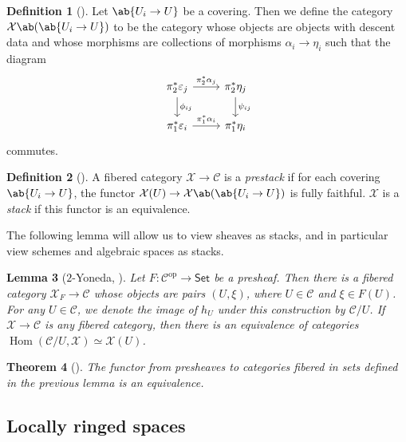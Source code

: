 \documentclass{amsart}
\newtheorem{thm}{Theorem}[section]
\newtheorem{lem}[thm]{Lemma}
\theoremstyle{definition}
\newtheorem{defn}[thm]{Definition}
\theoremstyle{remark}
\theoremstyle{plain}
\theoremstyle{definition}
\theoremstyle{remark}
\newcommand{\ep}{\varepsilon}
\newcommand{\mc}[1]{\mathcal{#1}}
\newcommand{\mr}[1]{\mathrm{#1}}
\newcommand{\ms}[1]{\mathsf{#1}}
\newcommand{\1}{\mathbf{1}}
\newcommand{\2}{\mathbf{2}}
\newcommand{\3}{\mathbf{3}}
\newcommand{\opp}{\mr{op}}
\DeclareMathOperator{\Hom}{Hom}
\begin{document}
\begin{defn}[{\cite[Section 6.1]{fganotes}}]
    Let $\ab\{U_i \to U\}$ be a covering. Then we define the category $\mc{X}\ab(\ab\{U_i \to U\})$ to be the category whose objects are objects with descent data and whose morphisms are collections of morphisms $\alpha_i \to \eta_i$ such that the diagram
    \begin{equation*}
    \begin{tikzcd}
        \pi_2^* \ep_j \ar{d}{\phi_{ij}} \ar{r}{\pi_2^* \alpha_j} & \pi_2^* \eta_j \ar{d}{\psi_{ij}} \\
        \pi_1^* \ep_i \ar{r}{\pi_1^* \alpha_i} & \pi_1^* \eta_i
    \end{tikzcd}
    \end{equation*}
    commutes.
\end{defn}

\begin{defn}[{\cite[Definition 6.1.5]{fganotes}}]
    A fibered category $\mc{X} \to \mc{C}$ is a \textit{prestack} if for each covering $\ab\{U_i \to U\}$, the functor $\mc{X}(U) \to \mc{X}\ab(\ab\{U_i \to U\})$ is fully faithful. $\mc{X}$ is a \textit{stack} if this functor is an equivalence.
\end{defn}

The following lemma will allow us to view sheaves as stacks, and in particular view schemes and algebraic spaces as stacks.

\begin{lem}[$2$-Yoneda, {\cite[Lemma 5.3.2]{fganotes}}]\label{lem:2yoneda}
    Let $F \colon \mc{C}^{\opp} \to \ms{Set}$ be a presheaf. Then there is a fibered category $\mc{X}_F \to \mc{C}$ whose objects are pairs $(U,\xi)$, where $U \in \mc{C}$ and $\xi \in F(U)$. For any $U \in \mc{C}$, we denote the image of $h_U$ under this construction by $\mc{C}/U$. If $\mc{X} \to \mc{C}$ is any fibered category, then there is an equivalence of categories $\Hom(\mc{C}/U, \mc{X}) \simeq \mc{X}(U)$.
\end{lem}

\begin{thm}[{\cite[Theorem 5.4.2]{fganotes}}]
    The functor from presheaves to categories fibered in sets defined in the previous lemma is an equivalence.
\end{thm}

\subsection{Locally ringed spaces}
\end{document}
